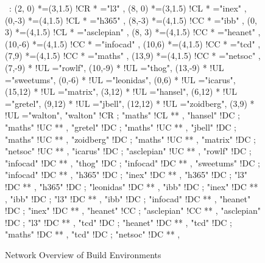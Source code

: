 
\begin{figure}

\begin{center}

\ \xy<1cm,0cm>:
(2, 0)  	*=(3,1.5) !CR  						*\frm{-} ="l3" , 
(8, 0)  	*=(3,1.5) !CL  							*\frm{-} ="inex" , 
(0,-3) 	*=(4,1.5) !CL  					*\frm{-} ="h365" , 
(8,-3) 	*=(4,1.5) !CC  			*\frm{-} ="ibb" , 
(0, 3)  	*=(4,1.5) !CL  					*\frm{-} ="asclepian" , 
(8, 3)  	*=(4,1.5) !CC  						*\frm{-} ="heanet" , 
(10,-6)  *=(4,1.5) !CC  						*\frm{-} ="infocad" , 
(10,6)  	*=(4,1.5) !CC  			*\frm{-} ="tcd" , 
(7,9)  	*=(4,1.5) !CC  *\frm{-} ="maths" , 
(13,9)  	*=(4,1.5) !CC  						*\frm{-} ="netsoc" , 
%
\POS (7,-9) * !UL ="rowlf",
\POS (10,-9) * !UL ="thog",
\POS (13,-9) * !UL ="sweetums",
%
\POS (0,-6) * !UL ="leonidas",
%
\POS (0,6) * !UL ="icarus",
%
\POS (15,12) * !UL ="matrix",
%
\POS (3,12) * !UL ="hansel",
\POS (6,12) * !UL ="gretel",
\POS (9,12) * !UL ="jbell",
\POS (12,12) * !UL ="zoidberg",
\POS (3,9) * !UL ="walton",
%
"walton" 	!CR ; "maths" 		!CL **\dir{-} ,
"hansel" 	!DC ; "maths" 		!UC **\dir{-} ,
"gretel" 	!DC ; "maths" 		!UC **\dir{-} ,
"jbell"  	!DC ; "maths" 		!UC **\dir{-} ,
"zoidberg"  !DC ; "maths" 		!UC **\dir{-} ,
%
"matrix"  	!DC ; "netsoc" 	!UC **\dir{-} ,
%
"icarus"  	!DC ; "asclepian" !UC **\dir{-} ,
%
"rowlf"  	!DC ; "infocad" 	!DC **\dir{-} ,
"thog"	  	!DC ; "infocad" 	!DC **\dir{-} ,
"sweetums" 	!DC ; "infocad" 	!DC **\dir{-} ,
%
"h365" 		!DC ; "inex" 		!DC **\dir{-} ,
"h365" 		!DC ; "l3" 			!DC **\dir{-} ,
"h365" 		!DC ; "leonidas" 	!DC **\dir{-} ,
%
"ibb" 		!DC ; "inex" 		!DC **\dir{-} ,
"ibb" 		!DC ; "l3" 			!DC **\dir{-} ,
"ibb" 		!DC ; "infocad" 	!DC **\dir{-} ,
%
"heanet" 	!DC ; "inex" 		!DC **\dir{-} ,
"heanet" 	!CC ; "asclepian" !CC **\dir{-} ,
%
"asclepian" !DC ; "l3" 			!DC **\dir{-} ,
%
"tcd" 		!DC ; "heanet" 	!DC **\dir{-} ,
"tcd" 		!DC ; "maths" 		!DC **\dir{-} ,
"tcd" 		!DC ; "netsoc" 	!DC **\dir{-} ,
\endxy

\end{center}

\caption{Network Overview of Build Environments}

\end{figure}

